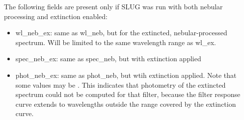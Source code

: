 \documentclass[letterpaper,10pt,english]{sphinxmanual}
\begin{document}
The following fields are present only if SLUG was run with both nebular processing and extinction enabled:
\begin{itemize}
\item {} 
wl\_neb\_ex: same as wl\_neb, but for the extincted, nebular-processed spectrum. Will be limited to the same wavelength range as wl\_ex.

\item {} 
spec\_neb\_ex: same as spec\_neb, but with extinction applied

\item {} 
phot\_neb\_ex: same as phot\_neb, but wtih extinction applied. Note that some values may be . This indicates that photometry of the extincted spectrum could not be computed for that filter, because the filter response curve extends to wavelengths outside the range covered by the extinction curve.

\end{itemize}
\end{document}
